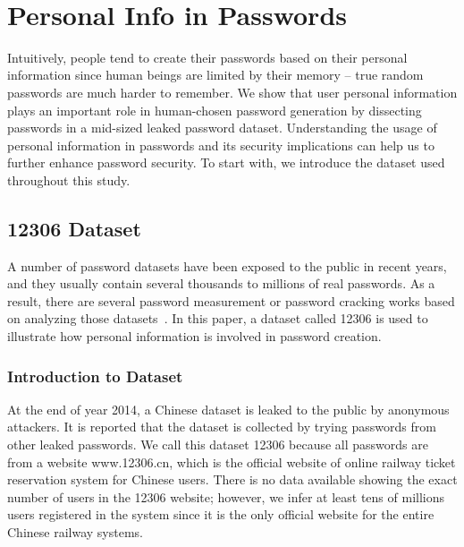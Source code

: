 \\
\section{Personal Info in Passwords}
\label{personalinfo}
Intuitively, people tend to create their passwords based on their
personal information since human beings are limited by their memory --
true random passwords are much harder to remember. We show that user
personal information plays an important role in human-chosen password
generation by dissecting passwords in a mid-sized leaked password
dataset.  Understanding the usage of personal information in passwords
and its security implications can help us to further enhance password
security. To start with, we introduce the dataset used throughout this
study.


\subsection{12306 Dataset}
A number of password datasets have been exposed to the public in
recent years, and they usually contain several thousands to millions
of real passwords. As a result, there are several password measurement
or password cracking works based on analyzing those
datasets~\cite{bonneau2012science, li2014large}. In this paper, a
dataset called 12306 is used to illustrate how personal information is
involved in password creation.

\subsubsection{Introduction to Dataset}
At the end of year 2014, a Chinese dataset is leaked to the public by
anonymous attackers. It is reported that the dataset is collected by
trying passwords from other leaked passwords. We
call this dataset 12306 because all passwords are from a website
www.12306.cn, which is the official website of online railway ticket
reservation system for Chinese users. There is no data available
showing the exact number of users in the 12306 website; however, we
infer at least tens of millions users registered in the system since
it is the only official website for the entire Chinese railway
systems.


